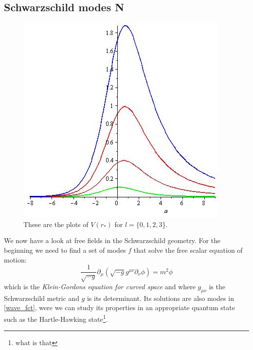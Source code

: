 \subsection{Schwarzschild modes \textbf{N}}
	\begin{figure} [tbp]
		\begin{center}
			\includegraphics[scale=0.5]{plots_of_V}
			\caption{These are the plots of $V(r_*)$ for $l=\{0,1,2,3$\}.} \label{plots_of_V}
		\end{center}
	\end{figure} %

	We now have a look at free fields in the Schwarzschild geometry. For the beginning we need to find a set of modes $f$ that solve the free scalar equation of motion:
		\begin{equation} \label{Klein_Gordon_curved}
			\frac{1}{\sqrt{-g}} \partial_\mu (\sqrt{-g} g^{\mu \nu} \partial_\nu \phi)
			= m^2 \phi
		\end{equation}
	which is the \textit{Klein-Gordons equation for curved space} and where $g_{\mu \nu}$ is the Schwarzschild metric and $g$ is its determinant. Its solutions are also modes in \eqref{wave_fct}, were we can study its properties in an appropriate quantum state such as the Hartle-Hawking state\footnote{what is that}.
	
